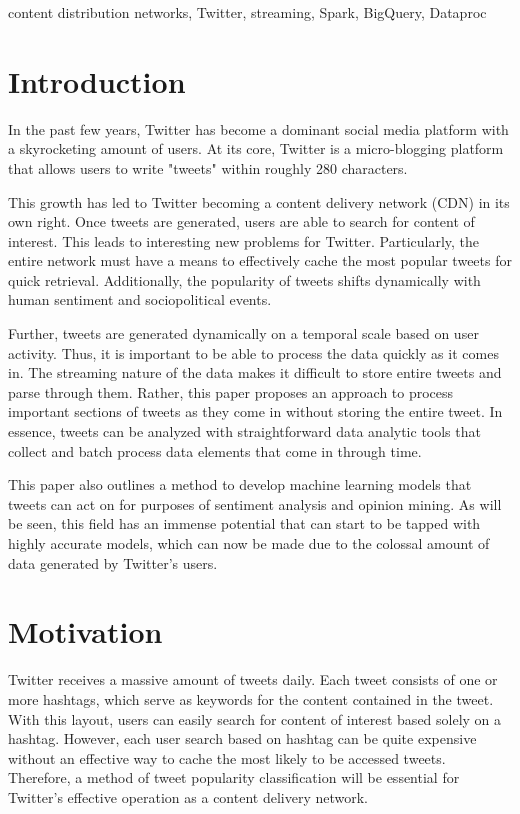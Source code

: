 \documentclass[conference]{IEEEtran}
\begin{document}
\begin{IEEEkeywords}
content distribution networks, Twitter, streaming, Spark, BigQuery, Dataproc
\end{IEEEkeywords}

\section{Introduction}
In the past few years, Twitter has become a dominant social media platform with a skyrocketing amount of users. At its core, Twitter is a micro-blogging platform that allows users to write "tweets" within roughly 280 characters. \par

This growth has led to Twitter becoming a content delivery network (CDN) in its own right. Once tweets are generated, users are able to search for content of interest. This leads to interesting new problems for Twitter. Particularly, the entire network must have a means to effectively cache the most popular tweets for quick retrieval. Additionally, the popularity of tweets shifts dynamically with human sentiment and sociopolitical events. \par

Further, tweets are generated dynamically on a temporal scale based on user activity. Thus, it is important to be able to process the data quickly as it comes in. The streaming nature of the data makes it difficult to store entire tweets and parse through them. Rather, this paper proposes an approach to process important sections of tweets as they come in without storing the entire tweet. In essence, tweets can be analyzed with straightforward data analytic tools that collect and batch process data elements that come in through time. \par

This paper also outlines a method to develop machine learning models that tweets can act on for purposes of sentiment analysis and opinion mining. As will be seen, this field has an immense potential that can start to be tapped with highly accurate models, which can now be made due to the colossal amount of data generated by Twitter's users. \par

\section{Motivation}
Twitter receives a massive amount of tweets daily. Each tweet consists of one or more hashtags, which serve as keywords for the content contained in the tweet. With this layout, users can easily search for content of interest based solely on a hashtag. However, each user search based on hashtag can be quite expensive without an effective way to cache the most likely to be accessed tweets. Therefore, a method of tweet popularity classification will be essential for Twitter's effective operation as a content delivery network. \par
\end{document}
